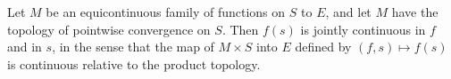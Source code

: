 Let $M$ be an equicontinuous family of functions on $S$ to $E$, and let $M$ have the topology of pointwise convergence on $S$. Then $f(s)$ is jointly continuous in $f$ and in $s$, in the sense that the map of $M \times S$ into $E$ defined by $(f,s) \mapsto f(s)$ is continuous relative to the product topology.
